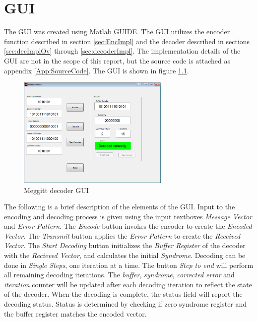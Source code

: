 \documentclass[Main]{subfiles}
\begin{document}
\chapter{GUI}
\label{cha:gui}

The GUI was created using Matlab GUIDE. The GUI utilizes the encoder function described in section \ref{sec:EncImpl} and the decoder described in sections \ref{sec:decImplOv} through \ref{sec:decoderImpl}. The implementation details of the GUI are not in the scope of this report, but the source code is attached as appendix \ref{App:SourceCode}.
The GUI is shown in figure \ref{fig:meggittGUI}.

\begin{figure}[h]
    \centering
    \includegraphics[width=0.65\textwidth]{figures/gui}
    \caption{Meggitt decoder GUI}
    \label{fig:meggittGUI}
\end{figure}

The following is a brief description of the elements of the GUI. Input to the encoding and decoding process is given using the input textboxes \emph{Message Vector} and \emph{Error Pattern}. The \textit{Encode} button invokes the encoder to create the \emph{Encoded Vector}. The \emph{Transmit} button applies the \emph{Error Pattern} to create the \emph{Received Vector}. The \emph{Start Decoding} button initializes the \emph{Buffer Register} of the decoder with the \emph{Recieved Vector}, and calculates the initial \emph{Syndrome}. Decoding can be done in \emph{Single Steps}, one iteration at a time. The button \emph{Step to end} will perform all remaining decoding iterations. The \emph{buffer}, \emph{syndrome}, \emph{corrected error} and \emph{iteration} counter will be updated after each decoding iteration to reflect the state of the decoder. When the decoding is complete, the status field will report the decoding status. Status is determined by checking if zero syndrome register and the buffer register matches the encoded vector.
\end{document}
